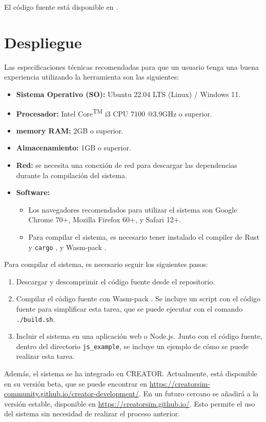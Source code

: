 \let\componentref\undefined

\noindent
El código fuente está disponible en \myrepo.

\FloatBarrier

\section{Despliegue}\label{sec:deployment}

\noindent
Las especificaciones técnicas recomendadas para que un usuario tenga una buena
experiencia utilizando la herramienta son las siguientes:

\begin{itemize}
    \item \textbf{Sistema Operativo (SO):} Ubuntu 22.04 LTS (Linux) / Windows 11.
    \item \textbf{Procesador:} Intel\textsuperscript{\textregistered} Core\textsuperscript{TM} i3 CPU 7100 @3.9GHz o superior.
    \item \textbf{\Gls{memory} RAM:} 2GB o superior.
    \item \textbf{Almacenamiento:} 1GB o superior.
    \item \textbf{Red:} se necesita una conexión de red para descargar las
    dependencias durante la compilación del sistema.
    \item \textbf{Software:}
    \begin{itemize}
        \item Los navegadores recomendados para utilizar el sistema son Google
        Chrome 70+, Mozilla Firefox 60+, y Safari 12+.
        \item Para compilar el sistema, es necesario tener instalado el
        \gls{compiler} de Rust y \verb!cargo! \parencite{rust-toolchain}, y Wasm-pack
        \parencite{Wasm-pack}.
    \end{itemize}
\end{itemize}

\noindent
Para compilar el sistema, es necesario seguir los siguientes pasos:

\begin{enumerate}
    \item Descargar y descomprimir el código fuente desde el repositorio.
    \item Compilar el código fuente con Wasm-pack \parencite{Wasm-pack}. Se
    incluye un script con el código fuente para simplificar esta tarea,
    que se puede ejecutar con el comando \verb!./build.sh!.
    \item Incluir el sistema en una aplicación web o Node.js. Junto con el
    código fuente, dentro del directorio \verb!js_example!, se incluye un
    ejemplo de cómo se puede realizar esta tarea.
\end{enumerate}

Además, el sistema se ha integrado en CREATOR. Actualmente, está disponible en
su versión beta, que se puede encontrar en
\url{https://creatorsim-community.github.io/creator-development/}. En un futuro
cercano se añadirá a la versión estable, disponible en
\url{https://creatorsim.github.io/}. Esto permite el uso del sistema sin
necesidad de realizar el proceso anterior.
